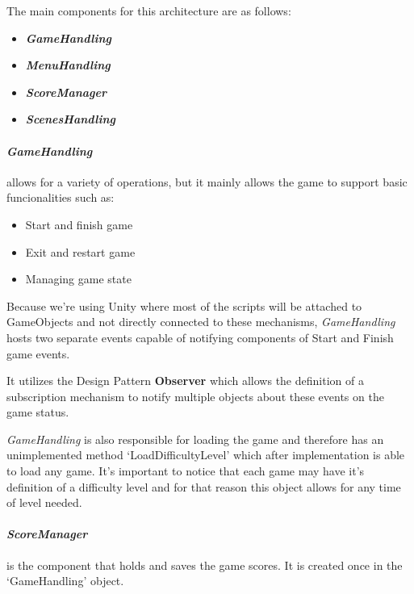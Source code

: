 The main components for this architecture are as follows:
\begin{itemize}
    \item \textbf{\textit{GameHandling}}
    \item  \textbf{\textit{MenuHandling}}
    \item \textbf{\textit{ScoreManager}}
    \item \textbf{\textit{ScenesHandling}}
\end{itemize}



\newpage
\paragraph{\textit{GameHandling}} allows for a variety of operations, but it mainly allows the game to support basic funcionalities such as:
\begin{itemize}
    \item Start and finish game
    \item Exit and restart game
    \item Managing game state
\end{itemize}

Because we're using Unity where most of the scripts will be attached to GameObjects and not directly connected to these mechanisms, \textit{GameHandling} hosts two separate events capable of notifying components of Start and Finish game events.

It utilizes the Design Pattern \textbf{Observer} \cite{observer} which allows the definition of a subscription mechanism to notify multiple objects about these events on the game status.

\textit{GameHandling} is also responsible for loading the game and therefore has an unimplemented method `LoadDifficultyLevel' which after implementation is able to load any game. It's important to notice that each game may have it's definition of a difficulty level and for that reason this object allows for any time of level needed.

\paragraph{\textit{ScoreManager}} is the component that holds and saves the game scores. It is created once in the `GameHandling' object.

